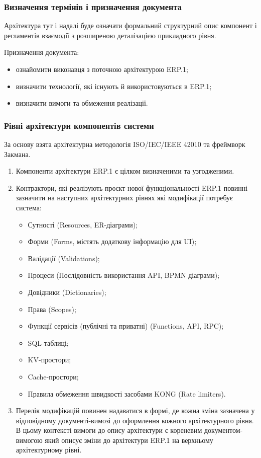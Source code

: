 \documentclass{article}
\begin{document}
\subsubsection{Визначення термінів і призначення документа}

Архітектура тут і надалі буде означати формальний структурний опис компонент і регламентів взаємодії з розширеною деталізацією прикладного рівня.

Призначення документа:
\begin{itemize}
  \item ознайомити виконавця з поточною архітектурою ERP.1;
  \item визначити технології, які існують й використовуються в ERP.1;
  \item визначити вимоги та обмеження реалізації.
\end{itemize}

\subsubsection{Рівні архітектури компонентів системи}

За основу взята архітектурна методологія ISO/IEC/IEEE 42010 та фреймворк Закмана.

\begin{enumerate}
  \item Компоненти архітектури ERP.1 є цілком визначеними та узгодженими.
  \item Контрактори, які реалізують проєкт нової функціональності ERP.1 повинні зазначити на
        наступних архітектурних рівнях які модифікації потребує система:
    \begin{itemize}
      \item Сутності (Resources, ER-діаграми);
      \item Форми (Forms, містять додаткову інформацію для UI);
      \item Валідації (Validations);
      \item Процеси (Послідовність використання API, BPMN діаграми);
      \item Довідники (Dictionaries);
      \item Права (Scopes);
      \item Функції сервісів (публічні та приватні) (Functions, API, RPC);
      \item SQL-таблиці;
      \item KV-простори;
      \item Cache-простори;
      \item Правила обмеження швидкості засобами KONG (Rate limiters).
    \end{itemize}
  \item Перелік модифікацій повинен надаватися в формі, де кожна зміна зазначена у відповідному
        документі-вимозі до оформлення кожного архітектурного рівня. В цьому контексті вимоги
        до опису архітектури є кореневим документом-вимогою який описує зміни до архітектури ERP.1
        на верхньому архітектурному рівні.
\end{enumerate}
\end{document}
